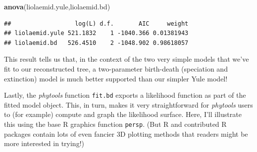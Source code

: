 \documentclass[fleqn,10pt,lineno]{wlpeerj} %
\newenvironment{Shaded}{\begin{snugshade}}{\end{snugshade}}
\newcommand{\FunctionTok}[1]{\textcolor[rgb]{0.13,0.29,0.53}{\textbf{#1}}}
\newcommand{\NormalTok}[1]{#1}
\begin{document}
\begin{Shaded}
\begin{Highlighting}[]
\FunctionTok{anova}\NormalTok{(liolaemid.yule,liolaemid.bd)}
\end{Highlighting}
\end{Shaded}

\begin{verbatim}
##                  log(L) d.f.       AIC     weight
## liolaemid.yule 521.1832    1 -1040.366 0.01381943
## liolaemid.bd   526.4510    2 -1048.902 0.98618057
\end{verbatim}

This result tells us that, in the context of the two very simple models that we've fit to our reconstructed tree, a two-parameter birth-death (speciation and extinction) model is much better supported than our simpler Yule model!

Lastly, the \emph{phytools} function \texttt{fit.bd} exports a likelihood function as part of the fitted model object. This, in turn, makes it very straightforward for \emph{phytools} users to (for example) compute and graph the likelihood surface. Here, I'll illustrate this using the base R graphics function \texttt{persp}. (But R and contributed R packages contain lots of even fancier 3D plotting methods that readers might be more interested in trying!)
\end{document}
